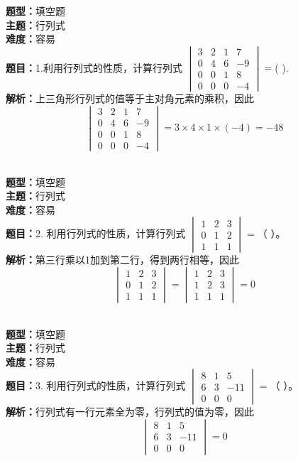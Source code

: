 \documentclass{ctexart}
\newenvironment{question}[5]{%
	\noindent\textbf{题型：}#1\\
	\textbf{主题：}#2\\
	\textbf{难度：}#3\\
	\textbf{题目：}#4\\
	\textbf{解析：}#5\\
	\vspace{1em}
}{}
\begin{document}
	\begin{question}
		{填空题}
		{行列式}
		{容易}
		{1.利用行列式的性质，计算行列式 $\begin{vmatrix}3 & 2 & 1 & 7 \\ 0 & 4 & 6 & -9 \\ 0 & 0 & 1 & 8 \\ 0 & 0 & 0 & -4\end{vmatrix}=$(  ).}
		{上三角形行列式的值等于主对角元素的乘积，因此$$
			\begin{vmatrix}
				3 & 2 & 1 & 7 \\
				0 & 4 & 6 & -9 \\
				0 & 0 & 1 & 8 \\
				0 & 0 & 0 & -4
			\end{vmatrix}=3 \times 4 \times 1 \times(-4)=-48
			$$}
	\end{question}	
	
	\begin{question}
		{填空题}
		{行列式}
		{容易}
		{2. 利用行列式的性质，计算行列式 $\begin{vmatrix}1 & 2 & 3 \\ 0 & 1 & 2 \\ 1 & 1 & 1\end{vmatrix}=$（ ）。}
		{第三行乘以1加到第二行，得到两行相等，因此
			$$
			\begin{vmatrix}
				1 & 2 & 3 \\
				0 & 1 & 2 \\
				1 & 1 & 1
			\end{vmatrix}
			=\begin{vmatrix}
				1 & 2 & 3 \\
				1 & 2 & 3 \\
				1 & 1 & 1
			\end{vmatrix}=0
			$$}
	\end{question}
	
	\begin{question}
		{填空题}
		{行列式}
		{容易}
		{3. 利用行列式的性质，计算行列式 $\begin{vmatrix}8 & 1 & 5 \\ 6 & 3 & -11 \\ 0 & 0 & 0\end{vmatrix}=$（ ）。}
		{行列式有一行元素全为零，行列式的值为零，因此
			$$
			\begin{vmatrix}
				8 & 1 & 5 \\
				6 & 3 & -11 \\
				0 & 0 & 0
			\end{vmatrix}=0
			$$}
	\end{question}
	
\end{document}

